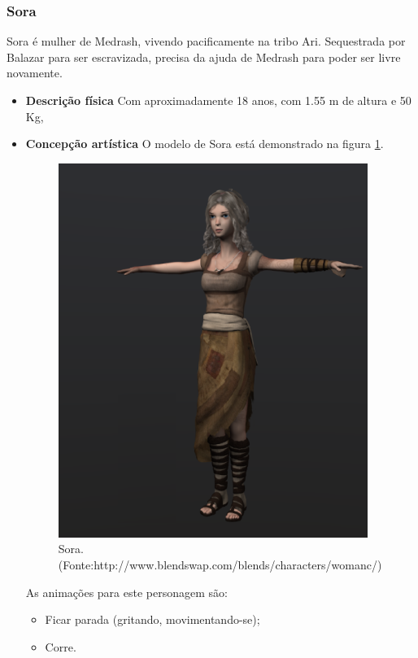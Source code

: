 \subsubsection{Sora}
Sora é mulher de Medrash, vivendo pacificamente na tribo Ari. Sequestrada
 por Balazar para ser escravizada, precisa da ajuda de Medrash para poder
 ser livre novamente.
\begin{itemize}
\item {\bf Descrição física}
Com aproximadamente 18 anos, com 1.55 m de altura e 50 Kg, 
\item {\bf Concepção artística}
O modelo de Sora está demonstrado na figura \ref{img:sora}.

\begin{figure}[!ht]
 \centering
 \includegraphics[scale=0.8]{Imagens/sora01.png}
 \caption{Sora.(Fonte:http://www.blendswap.com/blends/characters/womanc/)}
\label{img:sora}
\end{figure}


As animações para este personagem são:
\begin{itemize}
\item Ficar parada (gritando, movimentando-se);
\item Corre.
\end{itemize}
\end{itemize}

